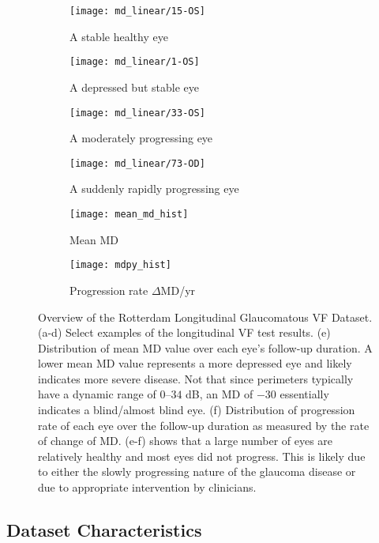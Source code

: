 \begin{figure}[p]
	\centering
	\begin{subfigure}[b]{0.49\textwidth}
		\centering
		\texttt{[image: md\_linear/15-OS]}
		\caption{A stable healthy eye}
	\end{subfigure}
	\hfill
	\begin{subfigure}[b]{0.49\textwidth}
		\centering
		\texttt{[image: md\_linear/1-OS]}
		\caption{A depressed but stable eye}
	\end{subfigure}
	\hfill
	\begin{subfigure}[b]{0.49\textwidth}
		\centering
		\texttt{[image: md\_linear/33-OS]}
		\caption{A moderately progressing eye}
	\end{subfigure}
	\hfill
	\begin{subfigure}[b]{0.49\textwidth}
		\centering
		\texttt{[image: md\_linear/73-OD]}
		\caption{A suddenly rapidly progressing eye}
	\end{subfigure}
	\hfill
	\begin{subfigure}[b]{0.49\textwidth}
		\centering
		\texttt{[image: mean\_md\_hist]}
		\caption{Mean MD}
		\label{fig:mean_md_hist}
	\end{subfigure}
	\hfill
	\begin{subfigure}[b]{0.49\textwidth}
		\centering
		\texttt{[image: mdpy\_hist]}
		\caption{Progression rate $\Delta$MD/yr}
		\label{fig:mdpy_hist}
	\end{subfigure}
	\caption{Overview of the Rotterdam Longitudinal Glaucomatous \ac{VF} Dataset. (a-d) Select examples of the longitudinal \ac{VF} test results. (e) Distribution of mean MD value over each eye's follow-up duration. A lower mean MD value represents a more depressed eye and likely indicates more severe disease. Not that since perimeters typically have a dynamic range of $0$--$34$ dB, an MD of $-30$ essentially indicates a blind/almost blind eye. (f) Distribution of progression rate of each eye over the follow-up duration as measured by the rate of change of MD. (e-f) shows that a large number of eyes are relatively healthy and most eyes did not progress. This is likely due to either the slowly progressing nature of the glaucoma disease or due to appropriate intervention by clinicians.}
\end{figure}

\subsection{Dataset Characteristics}

